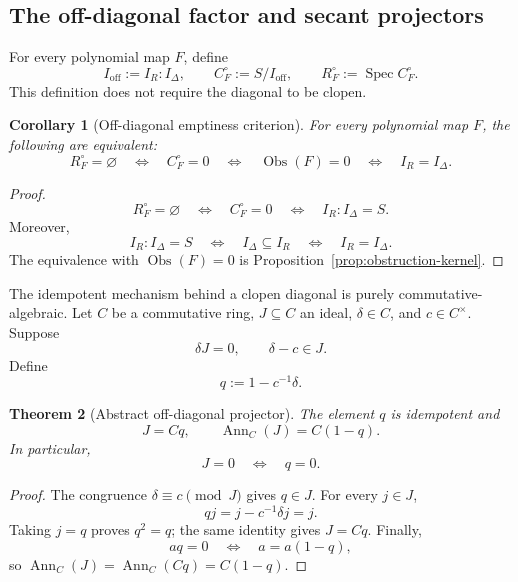 \documentclass[11pt]{article}
\newtheorem{theorem}{Theorem}[section]
\newtheorem{corollary}[theorem]{Corollary}
\theoremstyle{remark}
\theoremstyle{definition}
\DeclareMathOperator{\Spec}{Spec}
\DeclareMathOperator{\Ann}{Ann}
\newcommand{\Obs}{\operatorname{Obs}}
\begin{document}
\subsection{The off-diagonal factor and secant projectors}
\label{sec:secant-projector}

For every polynomial map \(F\), define
\[
  I_{\mathrm{off}}:=I_R:I_\Delta,
  \qquad
  C_F^\circ:=S/I_{\mathrm{off}},
  \qquad
  R_F^\circ:=\Spec C_F^\circ.
\]
This definition does not require the diagonal to be clopen.

\begin{corollary}[Off-diagonal emptiness criterion]
\label{cor:off-diagonal-empty-criterion}
For every polynomial map \(F\), the following are equivalent:
\[
  R_F^\circ=\varnothing
  \quad\Longleftrightarrow\quad
  C_F^\circ=0
  \quad\Longleftrightarrow\quad
  \Obs(F)=0
  \quad\Longleftrightarrow\quad
  I_R=I_\Delta.
\]
\end{corollary}

\begin{proof}
\[
  R_F^\circ=\varnothing
  \quad\Longleftrightarrow\quad
  C_F^\circ=0
  \quad\Longleftrightarrow\quad
  I_R:I_\Delta=S.
\]
Moreover,
\[
  I_R:I_\Delta=S
  \quad\Longleftrightarrow\quad
  I_\Delta\subseteq I_R
  \quad\Longleftrightarrow\quad
  I_R=I_\Delta.
\]
The equivalence with \(\Obs(F)=0\) is
Proposition~\ref{prop:obstruction-kernel}.
\end{proof}

The idempotent mechanism behind a clopen diagonal is purely
commutative-algebraic.  Let \(C\) be a commutative ring, \(J\subseteq C\)
an ideal, \(\delta\in C\), and \(c\in C^\times\).  Suppose
\[
  \delta J=0,
  \qquad
  \delta-c\in J.
\]
Define
\[
  q:=1-c^{-1}\delta.
\]

\begin{theorem}[Abstract off-diagonal projector]
\label{thm:abstract-off-diagonal-projector}
The element \(q\) is idempotent and
\[
  J=Cq,
  \qquad
  \Ann_C(J)=C(1-q).
\]
In particular,
\[
  J=0\quad\Longleftrightarrow\quad q=0.
\]
\end{theorem}

\begin{proof}
The congruence \(\delta\equiv c\pmod J\) gives \(q\in J\).  For every
\(j\in J\),
\[
  qj=j-c^{-1}\delta j=j.
\]
Taking \(j=q\) proves \(q^2=q\); the same identity gives \(J=Cq\).
Finally,
\[
  aq=0
  \quad\Longleftrightarrow\quad
  a=a(1-q),
\]
so \(\Ann_C(J)=\Ann_C(Cq)=C(1-q)\).
\end{proof}
\end{document}
